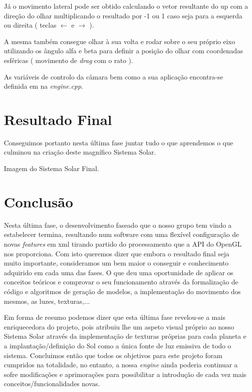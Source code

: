 \documentclass[11pt,a4paper]{report}
\begin{document}
Já o movimento lateral pode ser obtido calculando o vetor resultante do up com a direção do olhar multiplicando o resultado por -1 ou 1 caso seja para a esquerda ou direita ( teclas $\leftarrow$ e $\rightarrow$ ).

A mesma também consegue olhar à sua volta e rodar sobre o seu próprio eixo utilizando os ângulo alfa e beta para definir a posição do olhar com coordenadas esféricas ( movimento de \emph{drag} com o rato ).

As variáveis de controlo da câmara bem como a sua aplicação encontra-se definida em na \emph{engine.cpp}.

\chapter{Resultado Final}

Conseguimos portanto nesta última fase juntar tudo o que aprendemos o que culminou na criação deste magnífico Sistema Solar.

Imagem do Sistema Solar Final.

\chapter{Conclusão}

Nesta última fase, o desenvolvimento faseado que o nosso grupo tem vindo a estabelecer termina, resultando num software com uma flexível configuração de novas \emph{features} em xml tirando partido do processamento que a API do OpenGL nos proporciona. Com isto queremos dizer que embora o resultado final seja muito importante, consideramos um bem maior o conseguir e conhecimento adquirido em cada uma das fases. O que deu uma oportunidade de aplicar os conceitos teóricos e comprovar o seu funcionamento através da formalização de código e algoritmos de geração de modelos, a implementação do movimento dos mesmos, as luzes, texturas,...

Em forma de resumo podemos dizer que esta última fase revelou-se a mais enriquecedora do projeto, pois atribuiu lhe um aspeto visual próprio ao nosso Sistema Solar através da implementação de texturas próprias para cada planeta e a implantação/definição do Sol como a única fonte de luz emissiva de todo o sistema. Concluimos então que todos os objetivos para este projeto foram cumpridos na totalidade, no entanto, a nossa \emph{engine} ainda poderia continuar a sofre modificações e aprimorações para possibilitar a introdução de cada vez mais conceitos/funcionalidades novas.
\end{document}
